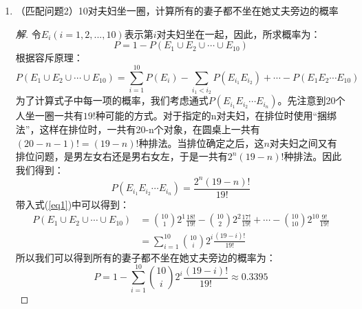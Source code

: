 \documentclass[12pt]{article}
\newcommand{\hei}{\CJKfamily{hei}}                          %
\begin{document}
\begin{enumerate}
\item {\hei （匹配问题2）10对夫妇坐一圈，计算所有的妻子都不坐在她丈夫旁边的概率}
\begin{proof}[解]
	令$E_i(i=1,2,...,10)$表示第$i$对夫妇坐在一起，因此，所求概率为：
	\begin{equation}
	P=1-P(E_1\cup E_2\cup \cdots \cup E_{10})
	\end{equation}
	根据容斥原理：
	\begin{equation}
	\label{eq1}
	P(E_1\cup E_2\cup \cdots \cup E_{10})=\sum_{i=1}^{10}P(E_i)-\sum_{i_1<i_2}P(E_{i_1}E_{i_2})+\cdots-P(E_1E_2\cdots E_{10})
	\end{equation}
	为了计算式子中每一项的概率，我们考虑通式$P(E_{i_1}E_{i_2}\cdots E_{i_n})$。先注意到20个人坐一圈一共有$19!$种可能的方式。对于指定的n对夫妇，在排位时使用“捆绑法”，这样在排位时，一共有20-n个对象，在圆桌上一共有$(20-n-1)!=(19-n)!$种排法。当排位确定之后，这$n$对夫妇之间又有排位问题，是男左女右还是男右女左，于是一共有$2^n(19-n)!$种排法。因此我们得到：
	\begin{equation}
	P(E_{i_1}E_{i_2}\cdots E_{i_n})=\frac{2^n(19-n)!}{19!}
	\end{equation}
	带入式(\ref{eq1})中可以得到：
	\begin{equation}
	\begin{aligned}
	P(E_1\cup E_2\cup \cdots \cup E_{10})&=\binom{10}{1}2^1\frac{18!}{19!}-\binom{10}{2}2^2\frac{17!}{19!}+\cdots-\binom{10}{10}2^{10}\frac{9!}{19!} \\
	&=\sum_{i=1}^{10}\binom{10}{i}2^i\frac{(19-i)!}{19!}
	\end{aligned}
	\end{equation}
	所以我们可以得到所有的妻子都不坐在她丈夫旁边的概率为：
	\begin{equation}
	P=1-\sum_{i=1}^{10}\binom{10}{i}2^i\frac{(19-i)!}{19!}\approx 0.3395
	\end{equation}
\end{proof}


\end{enumerate}
\end{document}
